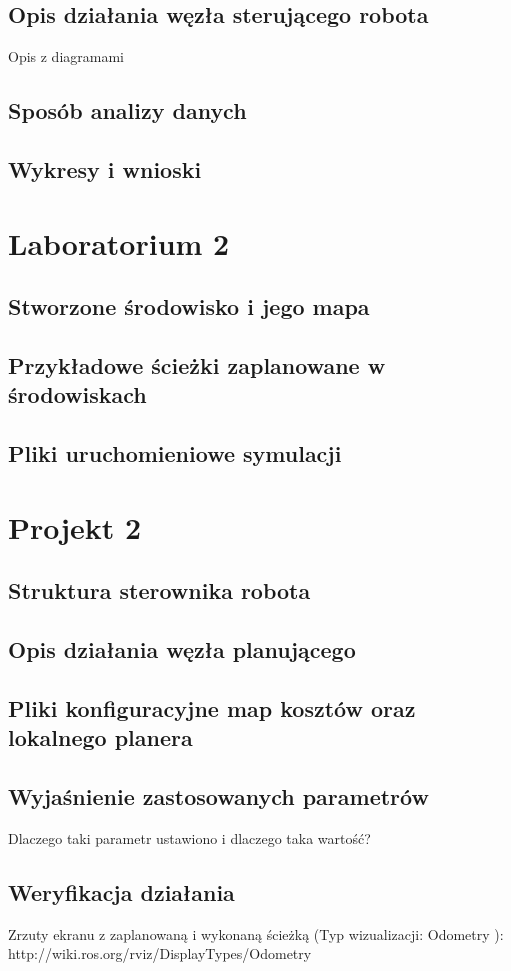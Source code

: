 \documentclass{mwrep}
\begin{document}
\section{Opis działania węzła sterującego robota}
Opis z diagramami
\section{Sposób analizy danych}

\section{Wykresy i wnioski}


\chapter{Laboratorium 2}

\section{Stworzone środowisko i jego mapa}

\section{Przykładowe ścieżki zaplanowane w środowiskach}

\section{Pliki uruchomieniowe symulacji}


\chapter{Projekt 2}

\section{Struktura sterownika robota}

\section{Opis działania węzła planującego}

\section{Pliki konfiguracyjne map kosztów oraz lokalnego planera}

\section{Wyjaśnienie zastosowanych parametrów}
Dlaczego taki parametr ustawiono i dlaczego taka wartość?
\section{Weryfikacja działania}
Zrzuty ekranu z zaplanowaną i wykonaną ścieżką (Typ
wizualizacji: Odometry ): http://wiki.ros.org/rviz/DisplayTypes/Odometry
\end{document}
